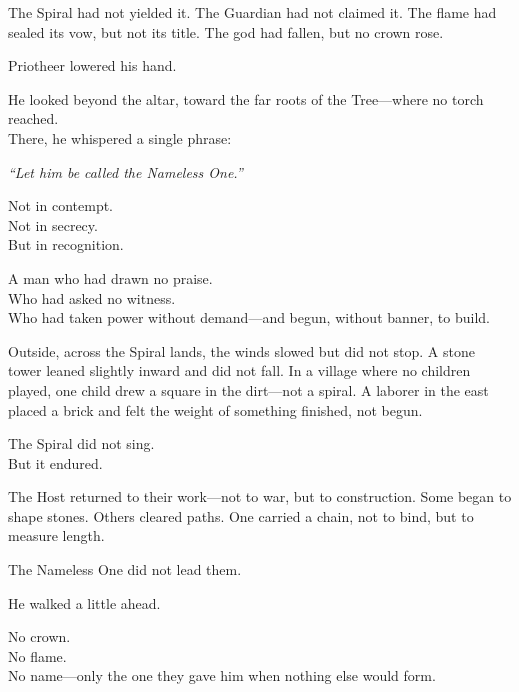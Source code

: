 \documentclass[9pt]{article}
\begin{document}
\vspace{0.5em}
The Spiral had not yielded it. The Guardian had not claimed it. The flame had sealed its vow, but not its title. The god had fallen, but no crown rose.

\vspace{0.5em}
Priotheer lowered his hand.

\vspace{0.5em}
He looked beyond the altar, toward the far roots of the Tree---where no torch reached.\\
There, he whispered a single phrase:

\vspace{0.5em}
\textit{``Let him be called the Nameless One.''}

\vspace{0.5em}
Not in contempt.\\
Not in secrecy.\\
But in recognition.

\vspace{0.5em}
A man who had drawn no praise.\\
Who had asked no witness.\\
Who had taken power without demand---and begun, without banner, to build.

\vspace{0.5em}
Outside, across the Spiral lands, the winds slowed but did not stop. A stone tower leaned slightly inward and did not fall. In a village where no children played, one child drew a square in the dirt---not a spiral. A laborer in the east placed a brick and felt the weight of something finished, not begun.

\vspace{0.5em}
The Spiral did not sing.\\
But it endured.

\vspace{0.5em}
The Host returned to their work---not to war, but to construction. Some began to shape stones. Others cleared paths. One carried a chain, not to bind, but to measure length.

\vspace{0.5em}
The Nameless One did not lead them.

\vspace{0.5em}
He walked a little ahead.

\vspace{0.5em}
No crown.\\
No flame.\\
No name---only the one they gave him when nothing else would form.
\end{document}
